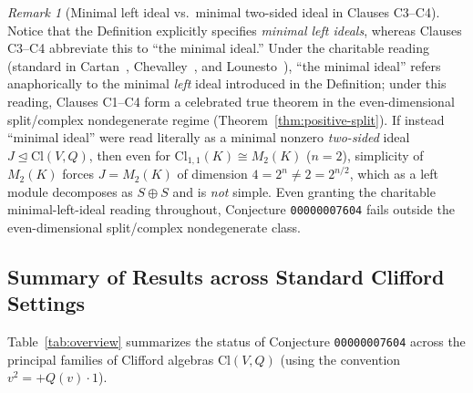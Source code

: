 \documentclass[11pt,a4paper]{article}
\theoremstyle{plain}
\theoremstyle{definition}
\theoremstyle{remark}
\newtheorem{remark}[theorem]{Remark}
\newcommand{\Cl}{\mathrm{Cl}}
\begin{document}
\begin{remark}[Minimal left ideal vs.\ minimal two-sided ideal in Clauses C3--C4]\label{rem:two-sided}
Notice that the Definition explicitly specifies \emph{minimal left ideals}, whereas Clauses C3--C4 abbreviate this to ``the minimal ideal.'' Under the charitable reading (standard in Cartan~\cite{Cartan1966}, Chevalley~\cite{Chevalley1954}, and Lounesto~\cite{Lounesto2001}), ``the minimal ideal'' refers anaphorically to the minimal \emph{left} ideal introduced in the Definition; under this reading, Clauses C1--C4 form a celebrated true theorem in the even-dimensional split/complex nondegenerate regime (Theorem~\ref{thm:positive-split}). If instead ``minimal ideal'' were read literally as a minimal nonzero \emph{two-sided} ideal $J \trianglelefteq \Cl(V, Q)$, then even for $\Cl_{1,1}(K) \cong M_2(K)$ ($n = 2$), simplicity of $M_2(K)$ forces $J = M_2(K)$ of dimension $4 = 2^n \neq 2 = 2^{n/2}$, which as a left module decomposes as $S \oplus S$ and is \emph{not} simple. Even granting the charitable minimal-left-ideal reading throughout, Conjecture \texttt{00000007604} fails outside the even-dimensional split/complex nondegenerate class.
\end{remark}

\subsection{Summary of Results across Standard Clifford Settings}
Table~\ref{tab:overview} summarizes the status of Conjecture \texttt{00000007604} across the principal families of Clifford algebras $\Cl(V, Q)$ (using the convention $v^2 = +Q(v)\cdot 1$).
\end{document}

